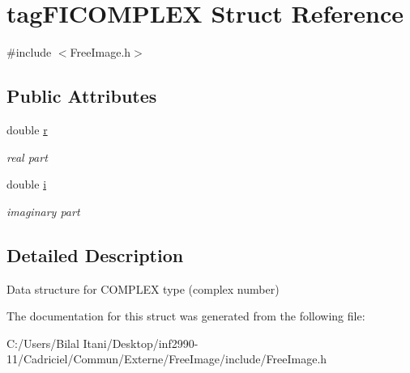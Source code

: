\hypertarget{structtag_f_i_c_o_m_p_l_e_x}{}\section{tag\+F\+I\+C\+O\+M\+P\+L\+EX Struct Reference}
\label{structtag_f_i_c_o_m_p_l_e_x}


{\ttfamily \#include $<$Free\+Image.\+h$>$}

\subsection*{Public Attributes}
\begin{DoxyCompactItemize}
\item 
double \hyperlink{structtag_f_i_c_o_m_p_l_e_x_a448818f3de56c81064bdcb1ba78a7ead}{r}\hypertarget{structtag_f_i_c_o_m_p_l_e_x_a448818f3de56c81064bdcb1ba78a7ead}{}\label{structtag_f_i_c_o_m_p_l_e_x_a448818f3de56c81064bdcb1ba78a7ead}

\begin{DoxyCompactList}\small\item\em real part \end{DoxyCompactList}\item 
double \hyperlink{structtag_f_i_c_o_m_p_l_e_x_ad2cc2cc6d32c1e5496f2c77e185d8218}{i}\hypertarget{structtag_f_i_c_o_m_p_l_e_x_ad2cc2cc6d32c1e5496f2c77e185d8218}{}\label{structtag_f_i_c_o_m_p_l_e_x_ad2cc2cc6d32c1e5496f2c77e185d8218}

\begin{DoxyCompactList}\small\item\em imaginary part \end{DoxyCompactList}\end{DoxyCompactItemize}


\subsection{Detailed Description}
Data structure for C\+O\+M\+P\+L\+EX type (complex number) 

The documentation for this struct was generated from the following file\+:\begin{DoxyCompactItemize}
\item 
C\+:/\+Users/\+Bilal Itani/\+Desktop/inf2990-\/11/\+Cadriciel/\+Commun/\+Externe/\+Free\+Image/include/Free\+Image.\+h\end{DoxyCompactItemize}

